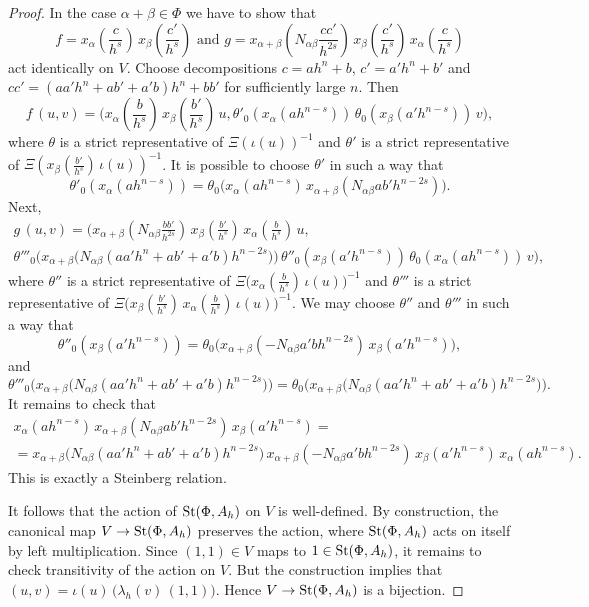 \documentclass[oneside, 11pt]{amsart} \pdfoutput=1
\begin{document}
\begin{proof}
In the case $\alpha + \beta \in \Phi$ we have to show that
$$\textstyle
f = x_\alpha(\frac c {h^s})\, x_\beta(\frac{c'}{h^s})
\text{ and }
g = x_{\alpha + \beta}(N_{\alpha \beta} \frac{cc'}{h^{2s}})\, x_\beta(\frac{c'}{h^s})\, x_\alpha(\frac c {h^s})
$$ 
act identically on $V$. Choose decompositions $c = ah^n + b$, $c' = a'h^n + b'$ and $cc' = (aa' h^n + ab' + a'b) h^n + bb'$ for sufficiently large \(n\).
Then
$$\textstyle
f\,(u, v) = \bigl(x_\alpha(\frac b {h^s})\, x_\beta(\frac{b'}{h^s})\, u,
\theta'_0(x_\alpha(ah^{n - s}))\, \theta_0(x_\beta(a'h^{n - s}))\, v\bigr),
$$
where $\theta$ is a strict representative of $\Xi(\iota(u))^{-1}$ and $\theta'$ is a strict representative of $\Xi(x_\beta(\frac{b'}{h^s})\, \iota(u))^{-1}$. It is possible to choose $\theta'$ in such a way that
$$
\theta'_0(x_\alpha(ah^{n - s})) = \theta_0\bigl(x_\alpha(ah^{n - s})\, x_{\alpha + \beta}(N_{\alpha\beta} ab'h^{n - 2s})\bigr).
$$
Next, 
\begin{multline*}\textstyle
g\, (u, v) = \bigl(x_{\alpha+\beta}(N_{\alpha \beta} \frac{bb'}{h^{2s}})\, x_\beta(\frac{b'}{h^s})\, x_\alpha(\frac b {h^s})\, u,\\
\theta'''_0\bigl(x_{\alpha + \beta}\bigl(N_{\alpha \beta} (aa' h^n + ab' + a'b) h^{n - 2s}\bigr)\bigr)\, \theta''_0(x_\beta(a'h^{n-s}))\, \theta_0(x_\alpha(ah^{n - s}))\, v\bigr),
\end{multline*}
where $\theta''$ is a strict representative of $\Xi\bigl(x_\alpha(\frac b {h^s})\, \iota(u)\bigr)^{-1}$ and $\theta'''$ is a strict representative of $\Xi\bigl(x_\beta(\frac{b'}{h^s})\, x_\alpha(\frac b{h^s})\, \iota(u)\bigr)^{-1}$. We may choose $\theta''$ and $\theta'''$ in such a way that 
$$
\theta''_0(x_\beta(a' h^{n - s})) = \theta_0\bigl(x_{\alpha + \beta}(-N_{\alpha \beta} a'bh^{n - 2s})\, x_\beta(a'h^{n - s})\bigr),
$$
and
$$
\theta'''_0\bigl(x_{\alpha + \beta}\bigl(N_{\alpha \beta} (aa'h^n + ab' + a'b) h^{n - 2s}\bigr)\bigr) = \theta_0\bigl(x_{\alpha + \beta}\bigl(N_{\alpha \beta} (aa'h^n + ab' + a'b) h^{n - 2s}\bigr)\bigr).
$$
It remains to check that
\begin{multline*}
x_\alpha(ah^{n - s})\, x_{\alpha + \beta}(N_{\alpha \beta} ab' h^{n - 2s})\, x_\beta(a' h^{n - s}) =\\
= x_{\alpha + \beta}\bigl(N_{\alpha \beta} (aa' h^n + ab' + a'b) h^{n - 2s}\bigr)\, x_{\alpha + \beta}(-N_{\alpha\beta} a'bh^{n - 2s})\, x_\beta(a'h^{n - s})\, x_\alpha(ah^{n - s}).
\end{multline*}
This is exactly a Steinberg relation.

It follows that the action of $\mathop{\mathrm{St}}\nolimits(\Phi, A_h)$ on $V$ is well-defined. By construction, the canonical map \(V \to \mathop{\mathrm{St}}\nolimits(\Phi, A_h)\) preserves the action, where \(\mathop{\mathrm{St}}\nolimits(\Phi, A_h)\) acts on itself by left multiplication. Since \((1, 1) \in V\) maps to \(1 \in \mathop{\mathrm{St}}\nolimits(\Phi, A_h)\), it remains to check transitivity of the action on \(V\). But the construction implies that \((u, v) = \iota(u)\, \bigl(\lambda_h(v)\, (1, 1)\bigr)\). Hence \(V \to \mathop{\mathrm{St}}\nolimits(\Phi, A_h)\) is a bijection.


\end{proof}
\end{document}

